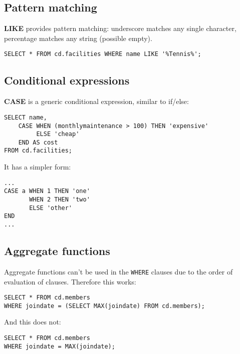 \documentclass{charun}
\begin{document}
\begin{multicols*}{2}


\subsection{Pattern matching}
\textbf{LIKE} provides pattern matching: underscore matches any single character, percentage matches any string (possible empty).
\begin{verbatim}
SELECT * FROM cd.facilities WHERE name LIKE '%Tennis%';
\end{verbatim}

\subsection{Conditional expressions}
\textbf{CASE} is a generic conditional expression, similar to if/else:
\begin{verbatim}
SELECT name,
    CASE WHEN (monthlymaintenance > 100) THEN 'expensive'
         ELSE 'cheap'
    END AS cost
FROM cd.facilities;
\end{verbatim}
It has a simpler form:
\begin{verbatim}
...
CASE a WHEN 1 THEN 'one'
       WHEN 2 THEN 'two'
       ELSE 'other'
END
...
\end{verbatim}

\subsection{Aggregate functions}
Aggregate functions can't be used in the \texttt{WHERE} clauses due to the order of evaluation of clauses. Therefore this works:
\begin{verbatim}
SELECT * FROM cd.members
WHERE joindate = (SELECT MAX(joindate) FROM cd.members);
\end{verbatim}
And this does not:
\begin{verbatim}
SELECT * FROM cd.members
WHERE joindate = MAX(joindate);
\end{verbatim}


\end{multicols*}
\end{document}
